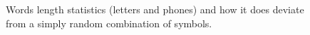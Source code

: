 \begin{figure}[p]
  \caption{Words length statistics (letters and phones) and how it does deviate from a simply random combination of symbols.}
  \label{fig:wordslength}
\end{figure}




